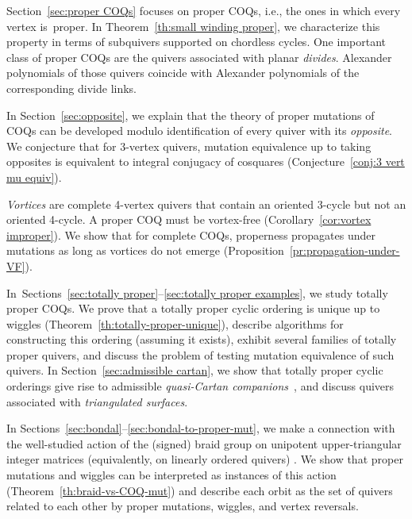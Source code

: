 \documentclass[11pt, letterpaper]{amsart}
\theoremstyle{definition}
\numberwithin{equation}{section}
\begin{document}
Section~\ref{sec:proper COQs} focuses on proper COQs, i.e., the ones in which every vertex is~proper. 
In Theorem~\ref{th:small winding proper}, we characterize this property in terms of subquivers supported on chordless cycles. 
%
One important class of proper COQs are the quivers associated with planar \emph{divides}.
Alexander polynomials of those quivers coincide with Alexander polynomials of the corresponding divide links. 

In Section~\ref{sec:opposite}, we explain that the theory of proper mutations of COQs can be developed 
modulo identification of every quiver with its \emph{opposite}.
We conjecture that for $3$-vertex quivers, mutation equivalence up to taking opposites is equivalent to 
integral conjugacy of cosquares (Conjecture~\ref{conj:3 vert mu equiv}). 

\emph{Vortices} are complete 4-vertex quivers that contain an oriented 3-cycle but not an oriented 4-cycle. 
A proper COQ must be vortex-free (Corollary~\ref{cor:vortex improper}). 
We show that for complete COQs, properness propagates under mutations as long as vortices do not emerge
(Proposition~\ref{pr:propagation-under-VF}).

In~Sections~\ref{sec:totally proper}--\ref{sec:totally proper examples}, 
we study totally proper COQs. 
We prove that a totally proper cyclic ordering is unique up to wiggles 
(Theorem~\ref{th:totally-proper-unique}),
describe algorithms for constructing this ordering (assuming it exists), 
exhibit several families of totally proper quivers,
and discuss the problem of testing mutation equivalence of such quivers. 
%
In Section~\ref{sec:admissible cartan}, we show that totally proper cyclic orderings give rise to 
admissible \emph{quasi-Cartan companions}~\cite{SevenAMatrices}, 
and discuss quivers associated with \emph{triangulated surfaces}. 

In Sections~\ref{sec:bondal}--\ref{sec:bondal-to-proper-mut}, we make a connection with 
the well-studied action of the (signed) braid group on unipotent upper-triangular integer matrices 
(equivalently, on linearly ordered quivers) \cite{Bondal, BP, CV, Dub, Rudakov}. 
We show that proper mutations and wiggles can be interpreted as instances of this action 
(Theorem~\ref{th:braid-vs-COQ-mut}) and describe each orbit as the set of quivers
related to each other by proper mutations, wiggles, and vertex reversals. 
\end{document}
